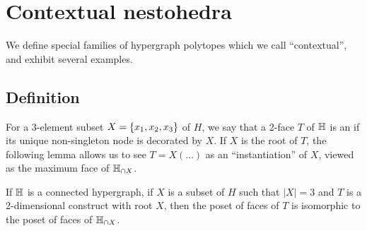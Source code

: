 
\section{Contextual nestohedra} 
\label{s:contextual}

We define special families of hypergraph polytopes which we call ``contextual'', and exhibit several examples.


\subsection{Definition}

For a 3-element subset $X=\left\{x_1,x_2,x_3\right\}$ of $H$, we say that a 2-face $T$ of ${\mathbb H}$ is an  if its unique non-singleton node is decorated by $X$.  
If $X$ is the root of $T$, the following  lemma allows us to see $T=X(\ldots)$ as an ``instantiation'' of $X$, viewed as the maximum face of ${\mathbb H}_{\cap X}$.

\begin{lemma} 
  \label{instance-construct} 
  If ${\mathbb H}$ is a connected hypergraph, if $X$ is a subset of $H$ such that $|X|=3$ and $T$ is a 2-dimensional construct with root $X$, then the poset of faces of $T$ is isomorphic to the poset of faces of ${\mathbb H}_{\cap X}$.
\end{lemma}

